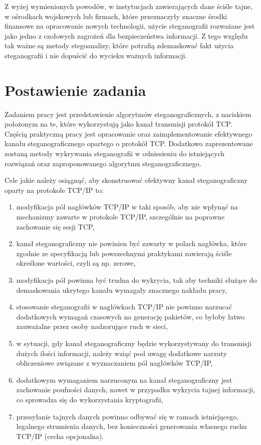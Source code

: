\documentclass[a4paper,12pt,twoside,openany]{report}
\begin{document}
Z wyżej wymienionych powodów, w instytucjach zawierających dane ściśle tajne, w ośrodkach wojskowych lub firmach, które przeznaczyły znaczne środki finansowe na opracowanie nowych technologii, użycie steganografii rozważane jest jako jedno z czołowych zagrożeń dla bezpieczeństwa informacji. Z tego względu tak ważne są metody stegoanalizy, które potrafią zdemaskować fakt użycia steganografii i nie dopuścić do wycieku ważnych informacji. 

\section{Postawienie zadania}

Zadaniem pracy jest przedstawienie algorytmów steganograficznych, z naciskiem położonym na te, które wykorzystują jako kanał transmisji protokół TCP. Częścią praktyczną pracy jest opracowanie oraz zaimplementowanie efektywnego kanału steganograficznego opartego o protokół TCP. Dodatkowo zaprezentowane zostaną metody wykrywania steganografii w odniesieniu do istniejących rozwiązań oraz  zaproponowanego algorytmu steganograficznego.

Cele jakie należy osiągnąć, aby skonstruować efektywny kanał steganograficzny oparty na protokole TCP/IP to:
\begin{enumerate}
	\item modyfikacja pól nagłówków TCP/IP w taki sposób, aby nie wpłynąć na mechanizmy zawarte w protokole TCP/IP, szczególnie na poprawne zachowanie się sesji TCP,
	\item kanał steganograficzny nie powinien być zawarty w polach nagłówka, które zgodnie ze specyfikacją lub powszechnymi praktykami zawierają ściśle określone wartości, czyli są np. zerowe,
	\item modyfikacja pól powinna być trudna do wykrycia, tak aby techniki służące do demaskowania ukrytego kanału wymagały znacznego nakładu pracy,
	\item stosowanie steganografii w nagłówkach TCP/IP nie powinno narzucać dodatkowych wymagań czasowych na generację pakietów, co byłoby łatwo zauważalne przez osoby nadzorujące ruch w sieci,
	\item w sytuacji, gdy kanał steganograficzny będzie wykorzystywany do transmisji dużych ilości informacji, należy wziąć pod uwagę dodatkowe narzuty obliczeniowe związane z wyznaczaniem pól nagłówków TCP/IP,
	\item dodatkowym wymaganiem narzuconym na kanał steganograficzny jest zachowanie poufności danych, nawet w przypadku wykrycia tajnej informacji, co sprowadza się do wykorzystania kryptografii,
	\item przesyłanie tajnych danych powinno odbywać się w ramach istniejącego, legalnego strumienia danych, bez konieczności generowania własnego ruchu TCP/IP (cecha opcjonalna).
\end{enumerate}
\end{document}
